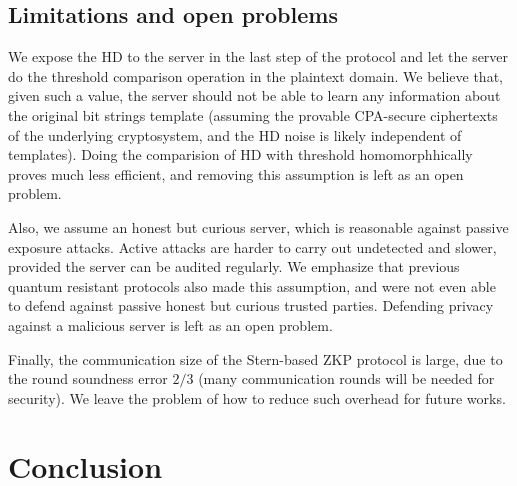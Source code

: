 \subsection{Limitations and open problems}
\label{sec:limitations}
We expose the HD to the server in the last step of the protocol and let the server do the threshold comparison
operation in the plaintext domain. We believe that, given such a value, the server should not be able to learn any
information about the original bit strings template (assuming the provable CPA-secure ciphertexts of the underlying
cryptosystem, and the HD noise is likely independent of templates). Doing the comparision of HD with threshold
homomorphhically proves much less efficient, and removing this assumption is left as an open problem.

Also, we assume an honest but curious server, which is reasonable against passive exposure attacks. Active attacks are
harder to carry out undetected and slower, provided the server can be audited regularly. We emphasize that previous quantum
resistant protocols also made this assumption, and were not even able to defend against passive honest but curious trusted
parties. Defending privacy against a malicious server is left as an open problem.

Finally, the communication size of the Stern-based ZKP protocol is large, due to the round soundness error \(2/3\) (many
communication rounds will be needed for security). We leave the problem of how to reduce such overhead for future works.



\section{Conclusion}
\label{sec:firstProcResults}




